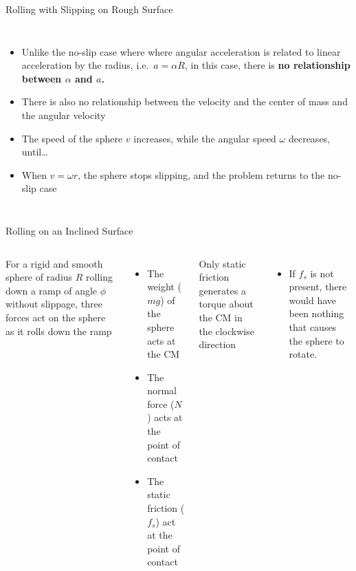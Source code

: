 \documentclass[12pt,compress,aspectratio=169]{beamer}
\begin{document}
\begin{frame}{Rolling with Slipping on Rough Surface}
  \begin{columns}
    

    \begin{itemize}
    \item Unlike the no-slip case where where angular acceleration is related
      to linear acceleration by the radius, i.e.\ $a=\alpha R$, in this case,
      there is \textbf{no relationship between $\alpha$ and $a$.}
    \item There is also no relationship between the velocity and the center
      of mass and the angular velocity
    \item The speed of the sphere $v$ increases, while the angular speed
      $\omega$ decreases, until\ldots
    \item When $v=\omega r$, the sphere stops slipping, and the problem returns
      to the no-slip case
    \end{itemize}
  \end{columns}
\end{frame}



\begin{frame}{Rolling on an Inclined Surface}
  \begin{columns}
    

    For a rigid and smooth sphere of radius $R$ rolling down a ramp of angle
    $\phi$ without slippage, three forces act on the sphere as it rolls down
    the ramp
    \begin{itemize}
    \item The weight ($mg$) of the sphere acts at the CM
    \item The normal force ($N$) acts at the point of contact
    \item The static friction ($f_s$) act at the point of contact
    \end{itemize}
    Only static friction generates a torque about the CM in the clockwise
    direction
    \begin{itemize}
    \item If $f_s$ is not present, there would have been nothing that causes
      the sphere to rotate.
    \end{itemize}
  \end{columns}
\end{frame}
\end{document}
